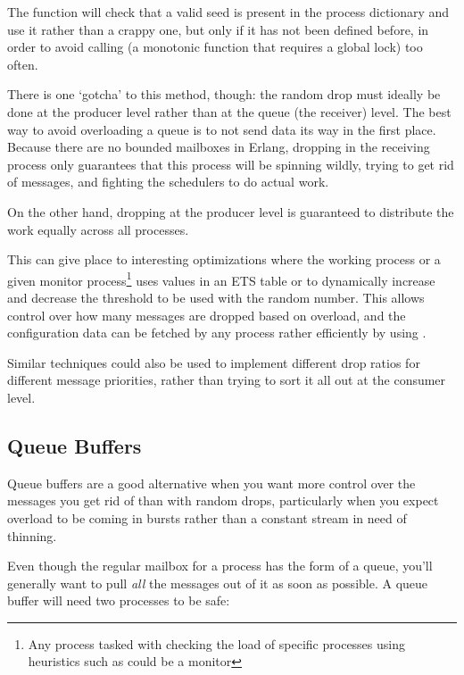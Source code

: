 \documentclass[11pt, oneside]{book}   	%
\begin{document}
The  function will check that a valid seed is present in the process dictionary and use it rather than a crappy one, but only if it has not been defined before, in order to avoid calling  (a monotonic function that requires a global lock) too often.

There is one `gotcha' to this method, though: the random drop must ideally be done at the producer level rather than at the queue (the receiver) level. The best way to avoid overloading a queue is to not send data its way in the first place. Because there are no bounded mailboxes in Erlang, dropping in the receiving process only guarantees that this process will be spinning wildly, trying to get rid of messages, and fighting the schedulers to do actual work.

On the other hand, dropping at the producer level is guaranteed to distribute the work equally across all processes.

This can give place to interesting optimizations where the working process or a given monitor process\footnote{Any process tasked with checking the load of specific processes using heuristics such as  could be a monitor} uses values in an ETS table or  to dynamically increase and decrease the threshold to be used with the random number. This allows control over how many messages are dropped based on overload, and the configuration data can be fetched by any process rather efficiently by using .

Similar techniques could also be used to implement different drop ratios for different message priorities, rather than trying to sort it all out at the consumer level.

\subsection{Queue Buffers}

Queue buffers are a good alternative when you want more control over the messages you get rid of than with random drops, particularly when you expect overload to be coming in bursts rather than a constant stream in need of thinning.

Even though the regular mailbox for a process has the form of a queue, you'll generally want to pull \emph{all} the messages out of it as soon as possible. A queue buffer will need two processes to be safe:
\end{document}
